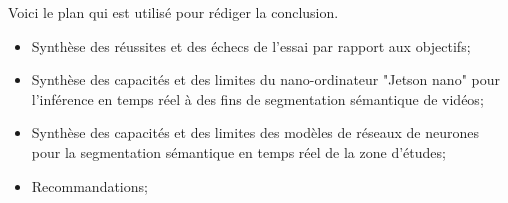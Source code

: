 \par Voici le plan qui est utilisé pour rédiger la conclusion.
\begin{itemize}
   \item Synthèse des réussites et des échecs de l'essai par rapport aux objectifs;
   \item Synthèse des capacités et des limites du nano-ordinateur "Jetson nano" pour l'inférence en temps réel à des fins de segmentation sémantique de vidéos;
   \item Synthèse des capacités et des limites des modèles de réseaux de neurones pour la segmentation sémantique en temps réel de la zone d’études;
   \item Recommandations;
\end{itemize}
